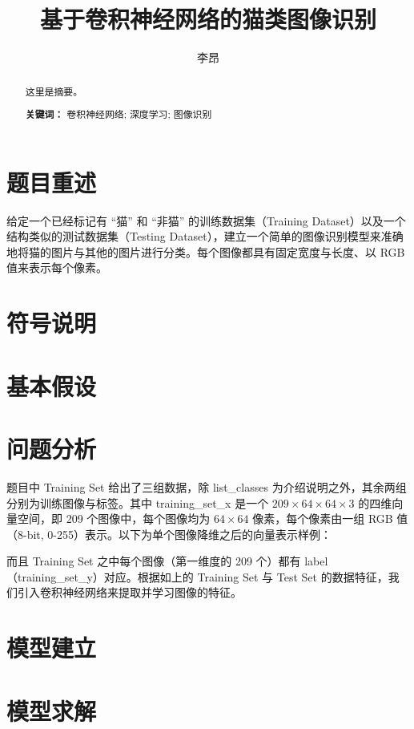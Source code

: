 \documentclass[UTF8]{ctexart}
\author{李昂}
\title{基于卷积神经网络的猫类图像识别}
\begin{document}
\maketitle
\begin{abstract}
这里是摘要。
\begin{flushleft}
\textbf{关键词：} 卷积神经网络; 深度学习; 图像识别
\end{flushleft}
\end{abstract}

\clearpage

\section{题目重述}
给定一个已经标记有 “猫” 和 “非猫” 的训练数据集（Training Dataset）以及一个结构类似的测试数据集（Testing Dataset），建立一个简单的图像识别模型来准确地将猫的图片与其他的图片进行分类。每个图像都具有固定宽度与长度、以 RGB 值来表示每个像素。

\section{符号说明}

\section{基本假设}

\section{问题分析}
题目中 Training Set 给出了三组数据，除 list\_classes 为介绍说明之外，其余两组分别为训练图像与标签。其中 training\_set\_x 是一个 $209 \times 64 \times 64 \times 3$ 的四维向量空间，即 209 个图像中，每个图像均为 $64 \times 64$ 像素，每个像素由一组 RGB 值（8-bit, 0-255）表示。以下为单个图像降维之后的向量表示样例：

而且 Training Set 之中每个图像（第一维度的 209 个）都有 label（training\_set\_y）对应。根据如上的 Training Set 与 Test Set 的数据特征，我们引入卷积神经网络来提取并学习图像的特征。

\section{模型建立}


\section{模型求解}
\end{document}
